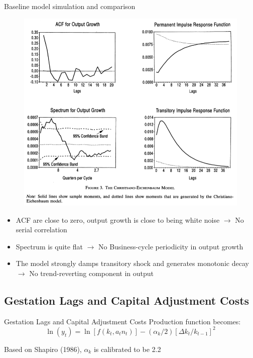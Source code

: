 \documentclass[10pt]{beamer}
\begin{document}
\begin{frame}{Baseline model simulation and comparison}
\begin{figure}
    \centering
  \includegraphics[width=0.5\linewidth]{baseline_all.png}
\end{figure}
\begin{itemize}
    \item  ACF are close to zero, output growth is close to being white noise $\rightarrow$  No serial correlation
    \item Spectrum is quite flat $\rightarrow$ No Business-cycle periodicity in output growth
    \item The model strongly damps transitory shock and generates monotonic decay $\rightarrow$ No trend-reverting component in output
\end{itemize}
\end{frame}

\subsection{Gestation Lags and Capital Adjustment Costs}

\begin{frame}{Gestation Lags and Capital Adjustment Costs}
    Production function becomes:
    $$
\ln \left(y_t\right)= \ln \left[f\left(k_t, a_t n_t\right)\right] -\left(\alpha_{k} / 2\right)\left[\Delta k_t / k_{t-1}\right]^2
$$

Based on Shapiro (1986), $\alpha_{k}$ is calibrated to be 2.2

\end{frame}
\end{document}
